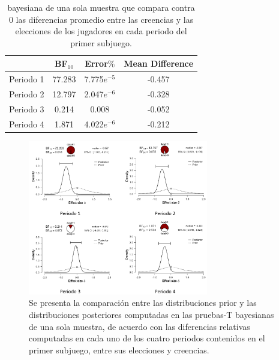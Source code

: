 \begin{table}
\caption[Diferencias Relativas en el Subjuego 1]{bayesiana de una sola muestra que compara contra 0 las diferencias promedio entre las creencias y las elecciones de los jugadores en cada periodo del primer subjuego.}
\label{DR_Sub1}
\centering
\begin{tabular}{l | c c c}  %
\toprule
\textbf{} & \textbf{BF$_{10}$} & \textbf{Error$\%$} & \textbf{Mean Difference}\\
\midrule
Periodo 1 & 77.283 & 7.775$e^{-5}$ & -0.457 \\
Periodo 2 & 12.797 & 2.047$e^{-6}$ & -0.328 \\
Periodo 3 & 0.214 & 0.008 & -0.052 \\
Periodo 4 & 1.871 & 4.022$e^{-6}$ & -0.212 \\
\bottomrule
\end{tabular}
\end{table}

\begin{figure}[th]
\centering
\includegraphics[width=0.70\textwidth]{Figures/Fig_3} 
\caption[Distribuciones prior y posterior de las Diferencias Relativas en el primer Subjuego, (prueba T bayesiana de una muestra)]{Se presenta la comparación entre las distribuciones prior y las distribuciones posteriores computadas en las pruebas-T bayesianas de una sola muestra, de acuerdo con las diferencias relativas computadas en cada uno de los cuatro periodos contenidos en el primer subjuego, entre sus elecciones y creencias.}
\label{fig:DiferenciasRelativas_Subjuego1}
\end{figure}

